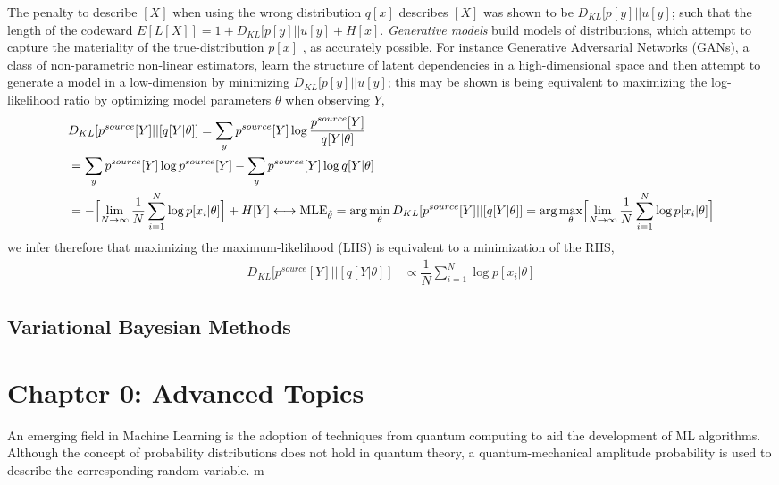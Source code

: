 \documentclass[7pt]{article}
\begin{document}
The penalty  to describe $[X]$ when using the wrong distribution $q[x]$ describes $[X]$ was shown to be $D_{KL} [p[y]||u[y]$; such that the length of the codeward $E[L[X]] = 1+ D_{KL} [p[y]||u[y] +  H[x]$. \emph{Generative models} build models of distributions, which attempt to capture the materiality of the true-distribution $p[x]$ , as accurately  possible. For instance Generative Adversarial Networks (GANs), a class of non-parametric non-linear estimators, learn the structure of latent dependencies in a high-dimensional space and then attempt to generate a model in a low-dimension by minimizing $D_{KL} [p[y]||u[y]$; this may be shown is being equivalent to maximizing the log-likelihood ratio by optimizing model parameters $\theta$ when observing $Y$,
\begin{equation}
\begin{split}
& D_{KL} [p^{source}[Y]||[q[Y|\theta]] = \sum_{y} p^{source}[Y] \log \dfrac{p^{source}[Y]}{q[Y|\theta]}  \\
& =   \sum_{y} p^{source}[Y] \log {p^{source}[Y] } - \sum_{y} p^{source}[Y] \log {q[Y|\theta]}\\
& =   - \Bigl[ \lim\limits_{ N \rightarrow \infty } \dfrac{1}{N} \sum^N_{i=1} \log p[x_i|\theta]\Bigr]+ H[Y]  \longleftrightarrow \text{MLE}_{\hat{\theta}} = \arg \min_{\theta} D_{KL} [p^{source}[Y]||[q[Y|\theta]] = \arg \max_{\theta} \Bigl[ \lim\limits_{ N \rightarrow \infty } \dfrac{1}{N} \sum^N_{i=1} \log p[x_i|\theta]\Bigr]  \\
\end{split}
\end{equation}
we infer therefore that maximizing the maximum-likelihood (LHS) is equivalent to a minimization of the RHS,
\begin{equation}
\begin{split}
 D_{KL} [p^{source}[Y]||[q[Y|\theta]] &  \propto \dfrac{1}{N} \sum^N_{i=1} \log p[x_i|\theta]
\end{split}
\end{equation}
\subsection{Variational Bayesian Methods}

\section{Chapter 0: Advanced Topics}
An emerging field in Machine Learning is the adoption of techniques from quantum computing to aid the development of ML algorithms.
Although the concept of probability distributions does not hold in quantum theory, a quantum-mechanical amplitude probability is used to describe the corresponding random variable.
m
\end{document}
